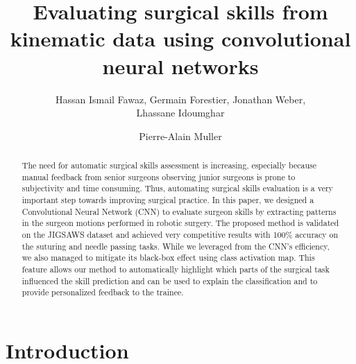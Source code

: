 \documentclass{llncs}
\begin{document}
\title{Evaluating surgical skills from kinematic data using convolutional neural networks}
  \author{Hassan Ismail Fawaz, 
Germain Forestier, 
Jonathan Weber, \\
Lhassane Idoumghar \and
Pierre-Alain Muller
}



\maketitle              

\begin{abstract}
The need for automatic surgical skills assessment is increasing, especially because manual feedback from senior surgeons observing junior surgeons is prone to subjectivity and time consuming. 
Thus, automating surgical skills evaluation is a very important step towards improving surgical practice. 
In this paper, we designed a Convolutional Neural Network (CNN) to evaluate surgeon skills by extracting patterns in the surgeon motions performed in robotic surgery. 
The proposed method is validated on the JIGSAWS dataset and achieved very competitive results with 100\% accuracy on the suturing and needle passing tasks. 
While we leveraged from the CNN’s efficiency, we also managed to mitigate its black-box effect using class activation map. 
This feature allows our method to automatically highlight which parts of the surgical task influenced the skill prediction and can be used to explain the classification and to provide personalized feedback to the trainee.

\end{abstract}

\section{Introduction}
\end{document}
